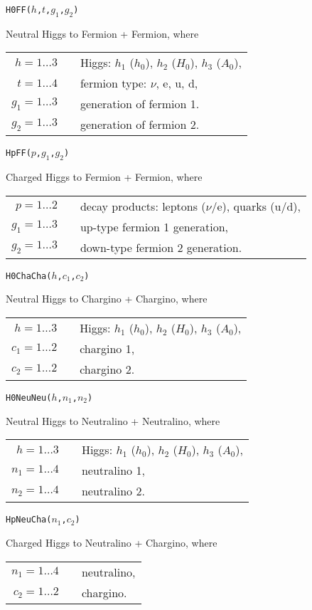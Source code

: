 \documentclass[12pt,a4paper]{report}
\newcommand{\CODE}[1]{\texttt{#1}}
\newcommand{\MACRO}[1]{\item
  \CODE{#1}\par}
\begin{document}
\MACRO{H0FF($h$,$t$,$g_1$,$g_2$)}
Neutral Higgs to Fermion + Fermion, where \\[.5ex]
\begin{tabular}{rcl}
  $h = 1\dots 3$ && Higgs:
                    $h_1$ ($h_0$), $h_2$ ($H_0$), $h_3$ ($A_0$), \\
  $t = 1\dots 4$ && fermion type: $\nu$, e, u, d, \\
  $g_1 = 1\dots 3$ && generation of fermion 1. \\
  $g_2 = 1\dots 3$ && generation of fermion 2.
\end{tabular}

\MACRO{HpFF($p$,$g_1$,$g_2$)}
Charged Higgs to Fermion + Fermion, where \\[.5ex]
\begin{tabular}{rcl}
  $p = 1\dots 2$ && decay products: leptons ($\nu$/e), quarks (u/d), \\
  $g_1 = 1\dots 3$ && up-type fermion 1 generation, \\
  $g_2 = 1\dots 3$ && down-type fermion 2 generation.
\end{tabular}

\MACRO{H0ChaCha($h$,$c_1$,$c_2$)}
Neutral Higgs to Chargino + Chargino, where \\[.5ex]
\begin{tabular}{rcl}
  $h = 1\dots 3$ && Higgs:
                    $h_1$ ($h_0$), $h_2$ ($H_0$), $h_3$ ($A_0$), \\
  $c_1 = 1\dots 2$ && chargino 1, \\
  $c_2 = 1\dots 2$ && chargino 2.
\end{tabular}

\MACRO{H0NeuNeu($h$,$n_1$,$n_2$)}
Neutral Higgs to Neutralino + Neutralino, where \\[.5ex]
\begin{tabular}{rcl}
  $h = 1\dots 3$ && Higgs:
                    $h_1$ ($h_0$), $h_2$ ($H_0$), $h_3$ ($A_0$), \\
  $n_1 = 1\dots 4$ && neutralino 1, \\
  $n_2 = 1\dots 4$ && neutralino 2.
\end{tabular}

\MACRO{HpNeuCha($n_1$,$c_2$)}
Charged Higgs to Neutralino + Chargino, where \\[.5ex]
\begin{tabular}{rcl}
  $n_1 = 1\dots 4$ && neutralino, \\
  $c_2 = 1\dots 2$ && chargino.
\end{tabular}
\end{document}
